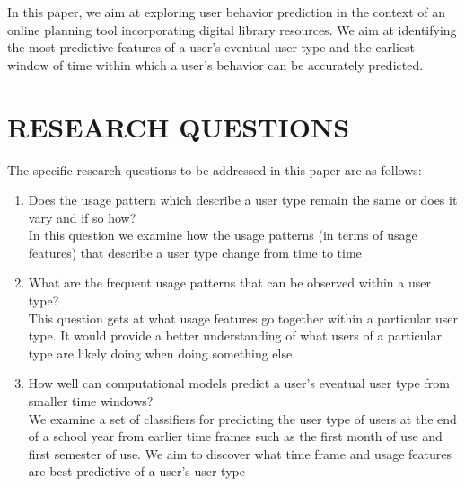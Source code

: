\documentclass{acm_proc_article-sp}
\begin{document}
In this paper, we aim at exploring user behavior prediction in the context of an online planning tool incorporating digital library resources. We aim at identifying the most predictive features of a user's eventual user type and the earliest window of time within which a user's behavior can be accurately predicted.

\section{RESEARCH QUESTIONS}
The specific research questions to be addressed in this paper are as follows:
\begin{enumerate}
\item Does the usage pattern which describe a user type remain the same or does it vary and if so how?
\\In this question we examine how the usage patterns (in terms of usage features) that describe a user type change from time to time
\item What are the frequent usage patterns that can be observed within a user type?
\\This question gets at what usage features go together within a particular user type. It would provide a better understanding of what users of a particular type are likely doing when doing something else.
\item How well can computational models predict a user's eventual user type from smaller time windows?
\\We examine a set of classifiers for predicting the user type of users at the end of a school year from earlier time frames such as
the first month of use and first semester of use. We aim to discover what time frame and usage features are best predictive of a user's user type
\end{enumerate}
\end{document}
